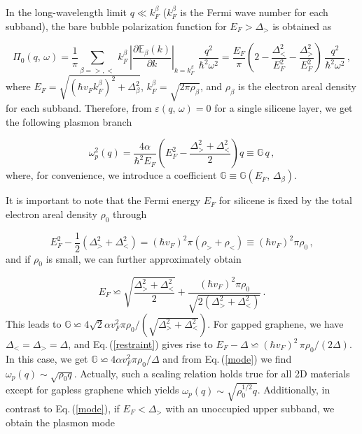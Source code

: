 \documentclass[aps,prb,showpacs]{revtex4}
\newcommand{\mbb}{\mathbb}
\begin{document}
In the long-wavelength limit $q\ll k^\beta_F$ ($k^\beta_F$ is the Fermi wave number for each subband), the bare bubble polarization function for $E_F>\Delta_>$ is obtained as\,\cite{sensarma}
 
\begin{equation}
\Pi_0(q,\,\omega) = \frac{1}{\pi}\sum_{\beta=>,<}\,k^\beta_F\,\left|\frac{\partial\mbb{E}_\beta(k)}{\partial k}\right|_{k = k^\beta_F} \, \,
\frac{q^2}{\hbar^2\omega^2}
=\frac{E_F}{\pi} \left(2 - \frac{\Delta_<^2}{E_F^2} - \frac{\Delta_>^2}{E_F^2} \right) \, \frac{q^2}{\hbar^2\omega^2}\, ,
\label{longw}
\end{equation}
where $E_F=\sqrt{(\hbar v_Fk^\beta_F)^2+\Delta^2_\beta}$, $k_F^\beta=\sqrt{2\pi \rho_\beta}$, and $\rho_\beta$ is the electron areal density for each subband.
Therefore, from $\varepsilon(q,\,\omega)=0$ for a single silicene layer, we get the following plasmon branch

\begin{equation}
\omega_p^2(q)  = \frac{4\alpha}{\hbar^2E_F}\left( E_F^2 - \frac{\Delta_>^2 + \Delta_<^2}{2} \right) q \equiv \mbb{G} \, q\, ,
\label{mode}
\end{equation}
where, for convenience, we introduce a coefficient $\mbb{G}\equiv \mbb{G}(E_F,\,\Delta_{\beta})$.
\medskip

It is important to note that the Fermi energy $E_F$ for silicene is fixed by the total electron areal density $\rho_0$ through

\begin{equation}
E_F^2 - \frac{1}{2} \left( \Delta_>^2 + \Delta_<^2 \right)=(\hbar v_F)^2\pi(\rho_>+\rho_<)\equiv(\hbar v_F)^2\pi\rho_0  \, ,
\end{equation}
and if $\rho_0$ is small, we can further approximately obtain

\begin{equation}
E_F \backsimeq \sqrt{\frac{\Delta_>^2 + \Delta_<^2}{2}} + \frac{(\hbar v_F)^2\pi\rho_0}{\sqrt{2 \left( \Delta_>^2 + \Delta_<^2 \right)}} \, .
\label{restraint}
\end{equation}
This leads to $\mbb{G}\backsimeq 4\sqrt{2}\alpha v_F^2\pi\rho_0/(\sqrt{\Delta_>^2 + \Delta_<^2})$.
For gapped graphene, we have $\Delta_< = \Delta_> = \Delta$, and Eq.\,(\ref{restraint}) gives rise to $ E_F - \Delta \backsimeq
(\hbar v_F)^2\,\pi\rho_0/(2\Delta)$. In this case, we get $\mbb{G}\backsimeq 4\alpha v_F^2\pi\rho_0/\Delta$ and from Eq.\,(\ref{mode}) we find $\omega_p(q)\sim\sqrt{\rho_0q}$.
Actually, such a scaling relation holds true for all 2D materials except for gapless graphene which yields $\omega_p(q)\sim\sqrt{\rho^{1/2}_0q}$.
Additionally, in contrast to Eq.\,(\ref{mode}), if $E_F < \Delta_>$ with an unoccupied upper subband, we obtain the plasmon mode
\end{document}
